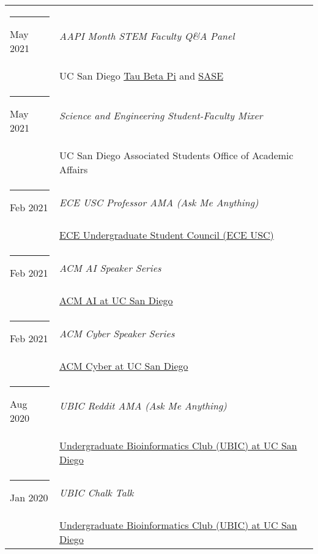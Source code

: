 \documentclass[margin,line]{res}
\begin{document}
\begin{resume}
\begin{longtable}{@{}p{0.7in}p{4in}}
\hspace*{-4mm} \rule{-1mm}{5mm} May 2021 & \textit{AAPI Month STEM Faculty Q\&A Panel}\\*
\hspace*{-4mm} & \hspace{4mm} UC San Diego \href{https://tbp.ucsd.edu/home}{Tau Beta Pi} and \href{https://saseatucsd.weebly.com/}{SASE}\\
\hspace*{-4mm} \rule{-1mm}{5mm} May 2021 & \textit{Science and Engineering Student-Faculty Mixer}\\*
\hspace*{-4mm} & \hspace{4mm} UC San Diego Associated Students Office of Academic Affairs\\
\hspace*{-4mm} \rule{-1mm}{5mm} Feb 2021 & \textit{ECE USC Professor AMA (Ask Me Anything)}\\*
\hspace*{-4mm} & \hspace{4mm} \href{https://eceusc.ucsd.edu/}{ECE Undergraduate Student Council (ECE USC)}\\
\hspace*{-4mm} \rule{-1mm}{5mm} Feb 2021 & \textit{ACM AI Speaker Series}\\*
\hspace*{-4mm} & \hspace{4mm} \href{https://ai.acmucsd.com/}{ACM AI at UC San Diego}\\
\hspace*{-4mm} \rule{-1mm}{5mm} Feb 2021 & \textit{ACM Cyber Speaker Series}\\*
\hspace*{-4mm} & \hspace{4mm} \href{https://www.facebook.com/cyberucsd}{ACM Cyber at UC San Diego}\\
\hspace*{-4mm} \rule{-1mm}{5mm} Aug 2020 & \textit{UBIC Reddit AMA (Ask Me Anything)}\\*
\hspace*{-4mm} & \hspace{4mm} \href{http://ubicucsd.github.io/}{Undergraduate Bioinformatics Club (UBIC) at UC San Diego}\\
\hspace*{-4mm} \rule{-1mm}{5mm} Jan 2020 & \textit{UBIC Chalk Talk}\\*
\hspace*{-4mm} & \hspace{4mm} \href{http://ubicucsd.github.io/}{Undergraduate Bioinformatics Club (UBIC) at UC San Diego}\\

\end{longtable}
\end{resume}
\end{document}
